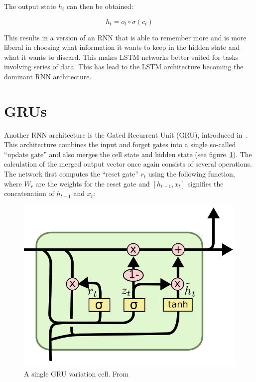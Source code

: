 The output state \(h_t\) can then be obtained:

\begin{equation} \label{eq:something}
h_t = o_t \circ \sigma(c_t)
\end{equation}

This results in a version of an RNN that is able to remember more and is more liberal in choosing what information it wants to keep in the hidden state and what it wants to discard. This makes LSTM networks better suited for tasks involving series of data. This has lead to the LSTM architecture becoming the dominant RNN architecture. 

\section{GRUs}
Another RNN architecture is the Gated Recurrent Unit (GRU), introduced in~\cite{cho2014learning}. This architecture combines the input and forget gates into a single so-called \enquote{update gate} and also merges the cell state and hidden state (see figure~\ref{fig:gru_cell}). The calculation of the merged output vector once again consists of several operations. The network first computes the \enquote{reset gate} \(r_t\) using the following function, where \(W_r\) are the weights for the reset gate and \([h_{t-1}, x_t]\) signifies the concatenation of \(h_{t-1}\) and \(x_t\):

\begin{figure}
	\begin{center}
		\includegraphics[scale=0.5]{rnn/gru_cell}
	\end{center}
	\caption{A single GRU variation cell. From~\cite{olah2015understanding}\label{fig:gru_cell}}
\end{figure}

